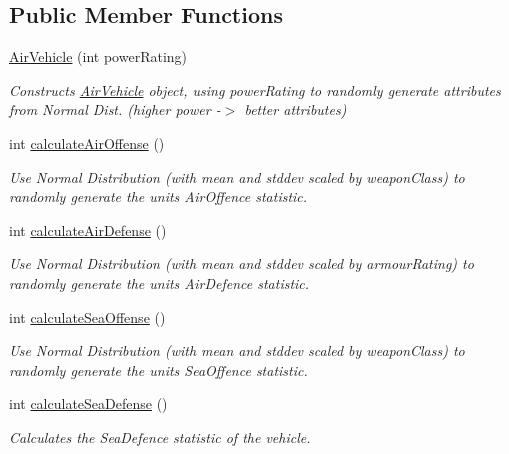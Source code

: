 \subsection*{Public Member Functions}
\begin{DoxyCompactItemize}
\item 
\mbox{\hyperlink{class_air_vehicle_a69b975622277ab88d8f034a213a55d64}{Air\+Vehicle}} (int power\+Rating)
\begin{DoxyCompactList}\small\item\em Constructs \mbox{\hyperlink{class_air_vehicle}{Air\+Vehicle}} object, using power\+Rating to randomly generate attributes from Normal Dist. (higher power -\/$>$ better attributes) \end{DoxyCompactList}\item 
int \mbox{\hyperlink{class_air_vehicle_a1365cb66c2a8755e689f938c734df6c0}{calculate\+Air\+Offense}} ()
\begin{DoxyCompactList}\small\item\em Use Normal Distribution (with mean and stddev scaled by weapon\+Class) to randomly generate the unit\textquotesingle{}s Air\+Offence statistic. \end{DoxyCompactList}\item 
int \mbox{\hyperlink{class_air_vehicle_ade9dabaec365370683599f3df95189c2}{calculate\+Air\+Defense}} ()
\begin{DoxyCompactList}\small\item\em Use Normal Distribution (with mean and stddev scaled by armour\+Rating) to randomly generate the unit\textquotesingle{}s Air\+Defence statistic. \end{DoxyCompactList}\item 
int \mbox{\hyperlink{class_air_vehicle_ad79fc5014baa403de34c435d3c2c14d0}{calculate\+Sea\+Offense}} ()
\begin{DoxyCompactList}\small\item\em Use Normal Distribution (with mean and stddev scaled by weapon\+Class) to randomly generate the unit\textquotesingle{}s Sea\+Offence statistic. \end{DoxyCompactList}\item 
int \mbox{\hyperlink{class_air_vehicle_a6a0912049937756912347a75cbd74c1b}{calculate\+Sea\+Defense}} ()
\begin{DoxyCompactList}\small\item\em Calculates the Sea\+Defence statistic of the vehicle. \end{DoxyCompactList}\item 

\end{DoxyCompactItemize}

